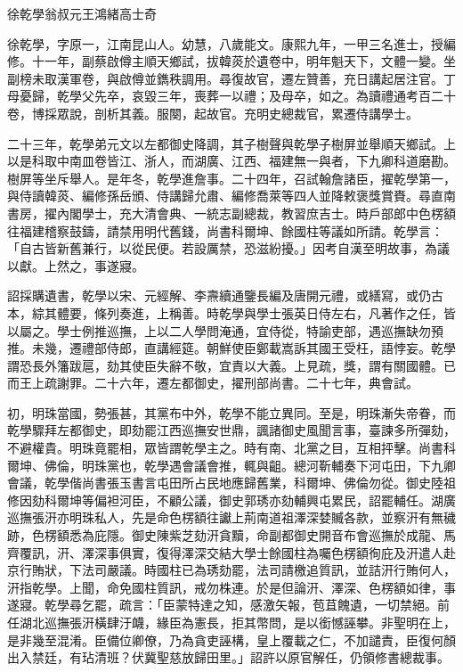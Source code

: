 
\begin{pinyinscope}
徐乾學翁叔元王鴻緒高士奇

徐乾學，字原一，江南昆山人。幼慧，八歲能文。康熙九年，一甲三名進士，授編修。十一年，副蔡啟僔主順天鄉試，拔韓菼於遺卷中，明年魁天下，文體一變。坐副榜未取漢軍卷，與啟僔並鐫秩調用。尋復故官，遷左贊善，充日講起居注官。丁母憂歸，乾學父先卒，哀毀三年，喪葬一以禮；及母卒，如之。為讀禮通考百二十卷，博採眾說，剖析其義。服闋，起故官。充明史總裁官，累遷侍講學士。

二十三年，乾學弟元文以左都御史降調，其子樹聲與乾學子樹屏並舉順天鄉試。上以是科取中南皿卷皆江、浙人，而湖廣、江西、福建無一與者，下九卿科道磨勘。樹屏等坐斥舉人。是年冬，乾學進詹事。二十四年，召試翰詹諸臣，擢乾學第一，與侍讀韓菼、編修孫岳頒、侍講歸允肅、編修喬萊等四人並降敕褒獎賞賚。尋直南書房，擢內閣學士，充大清會典、一統志副總裁，教習庶吉士。時戶部郎中色楞額往福建稽察鼓鑄，請禁用明代舊錢，尚書科爾坤、餘國柱等議如所請。乾學言：「自古皆新舊兼行，以從民便。若設厲禁，恐滋紛擾。」因考自漢至明故事，為議以獻。上然之，事遂寢。

詔採購遺書，乾學以宋、元經解、李燾續通鑒長編及唐開元禮，或繕寫，或仍古本，綜其體要，條列奏進，上稱善。時乾學與學士張英日侍左右，凡著作之任，皆以屬之。學士例推巡撫，上以二人學問淹通，宜侍從，特諭吏部，遇巡撫缺勿預推。未幾，遷禮部侍郎，直講經筵。朝鮮使臣鄭載嵩訴其國王受枉，語悖妄。乾學謂恐長外籓跋扈，劾其使臣失辭不敬，宜責以大義。上見疏，獎，謂有關國體。已而王上疏謝罪。二十六年，遷左都御史，擢刑部尚書。二十七年，典會試。

初，明珠當國，勢張甚，其黨布中外，乾學不能立異同。至是，明珠漸失帝眷，而乾學驟拜左都御史，即劾罷江西巡撫安世鼎，諷諸御史風聞言事，臺諫多所彈劾，不避權貴。明珠竟罷相，眾皆謂乾學主之。時有南、北黨之目，互相抨擊。尚書科爾坤、佛倫，明珠黨也，乾學遇會議會推，輒與齟。總河靳輔奏下河屯田，下九卿會議，乾學偕尚書張玉書言屯田所占民地應歸舊業，科爾坤、佛倫勿從。御史陸祖修因劾科爾坤等偏袒河臣，不顧公議，御史郭琇亦劾輔興屯累民，詔罷輔任。湖廣巡撫張汧亦明珠私人，先是命色楞額往讞上荊南道祖澤深婪贓各款，並察汧有無穢跡，色楞額悉為庇隱。御史陳紫芝劾汧貪黷，命副都御史開音布會巡撫於成龍、馬齊覆訊，汧、澤深事俱實，復得澤深交結大學士餘國柱為囑色楞額徇庇及汧遣人赴京行賄狀，下法司嚴議。時國柱已為琇劾罷，法司請檄追質訊，並詰汧行賄何人，汧指乾學。上聞，命免國柱質訊，戒勿株連。於是但論汧、澤深、色楞額如律，事遂寢。乾學尋乞罷，疏言：「臣蒙特達之知，感激矢報，苞苴餽遺，一切禁絕。前任湖北巡撫張汧橫肆汙衊，緣臣為憲長，拒其幣問，是以銜憾誣攀。非聖明在上，是非幾至混淆。臣備位卿僚，乃為貪吏誣構，皇上覆載之仁，不加譴責，臣復何顏出入禁廷，有玷清班？伏冀聖慈放歸田里。」詔許以原官解任，仍領修書總裁事。


\end{pinyinscope}
